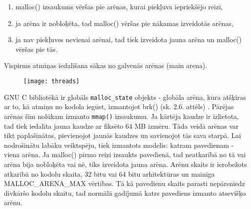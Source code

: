 \begin{enumerate}
\item malloc() izsaukums vēršas pie arēnas, kurai piekļuva iepriekšējo reizi,
\item ja arēna ir nobloķēta, tad malloc() vēršas pie nākamas izveidotās arēnas,
\item ja nav piekļuves nevienai arēnai, tad tiek izveidota jauna arēna un malloc() vēršas pie tās.
\end{enumerate}
Vispirms atmiņas iedalīšana sākas no galvenās arēnas (main arena). 
\begin{figure}[h]
\begin{center}
\texttt{[image: threads]}
\end{center}
\caption{\textbf{\fontsize{11}{12}\selectfont {Arēnas GNU C bibliotēkā }}}
\end{figure}

GNU C bibliotēkā ir globāls \texttt{malloc\_state} objekts - globāla arēna, kura atšķiras ar to, kā atmiņu no kodola iegūst, izmantojot brk() (sk. 2.6. attēls) \cite{AMM}. 
Pārējas arēnas šīm nolūkam izmanto \texttt{mmap()} izsaukumu. 
Ja kārtēja kaudze ir izlietota, tad tiek iedalīta jauna kaudze ar fiksēto 64 MB izmēru.
Tāda veidā arēnas var tikt paplašinātas, pievienojot jaunās kaudzes un savienojot tās sava starpā.
Lai nodrošinātu labāku veiktspēju, tiek izmantots modelis: katram pavedienam - viena arēna. 
Ja malloc() pirmo reizi izsaukts pavedienā, tad neatkarībā no tā vai arēna bija nobloķēta vai nē, tiks izveidota jauna arēna.
Arēnu skaits ir ierobežots atkarībā no kodolu skaita, 32 bitu vai 64 bitu arhitektūras un mainīga MALLOC\_ARENA\_MAX vērtības.
Tā kā pavedienu skaits parasti nepārsniedz divkāršo kodolu skaitu, tad normālā gadījumā katrs pavediens izmanto atsevišķo arēnu. 



